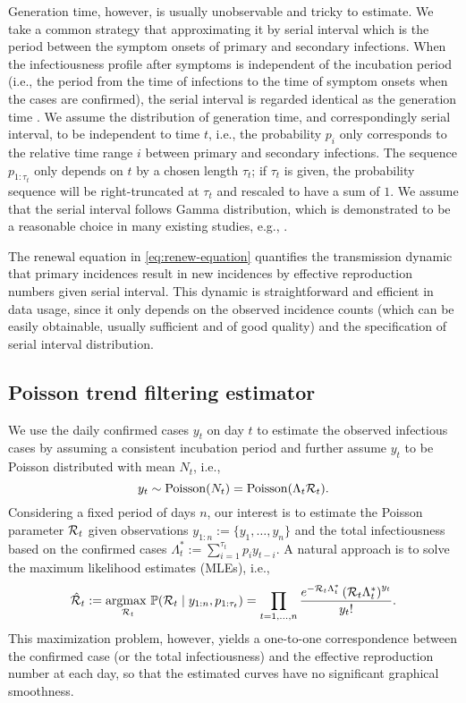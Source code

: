 Generation time, however, is usually unobservable and tricky to estimate. We take a common strategy that approximating it by serial interval which is the period between the symptom onsets of primary and secondary infections. When the infectiousness profile after symptoms is independent of the incubation period (i.e., the period from the time of infections to the time of symptom onsets when the cases are confirmed), the serial interval is regarded identical as the generation time \citep{cori2013new}. 
We assume the distribution of generation time, and correspondingly serial interval, to be independent to time $t$, i.e., the probability $p_i$ only corresponds to the relative time range $i$ between primary and secondary infections. The sequence $p_{1:\tau_t}$ only depends on $t$ by a chosen length $\tau_t$; if $\tau_t$ is given, the probability sequence will be right-truncated at $\tau_t$ and rescaled to have a sum of $1$. 
We assume that the serial interval follows Gamma distribution, which is demonstrated to be a reasonable choice in many existing studies, e.g., \cite{cori2013new,abry2020spatial,pascal2022nonsmooth}.


The renewal equation in \eqref{eq:renew-equation} quantifies the transmission dynamic that primary incidences result in new incidences by effective reproduction numbers given serial interval. This dynamic is straightforward and efficient in data usage, since it only depends on the observed incidence counts (which can be easily obtainable, usually sufficient and of good quality) and the specification of serial interval distribution. 

\subsection{Poisson trend filtering estimator} %

We use the daily confirmed cases $y_t$ on day $t$ to estimate the observed infectious cases by assuming a consistent incubation period and further assume $y_t$ to be Poisson distributed with mean $N_t$, i.e., 
\begin{equation*} 
  y_t \sim \mathrm{Poisson}(N_t) = \mathrm{Poisson}(\Lambda_t \mathcal{R}_t).
\end{equation*}
Considering a fixed period of days $n$, our interest is to estimate the Poisson parameter $\mathcal{R}_t$ given observations ${y}_{1:n} := \{y_1,\dots,y_n\}$ and the total infectiousness based on the confirmed cases $\Lambda^{\ast}_t := \sum_{i=1}^{\tau_t} p_i y_{t-i}$. A natural approach is to solve the maximum likelihood estimates (MLEs), i.e., 
\begin{equation} \label{eq:mle}
  \hat{\mathcal{R}}_t := \underset{\mathcal{R}_t}{\operatorname*{argmax}\ } \mathbb{P}(\mathcal{R}_t \mid y_{1:n}, p_{1:\tau_t}) = \prod_{t = 1,\dots,n} \frac{e^{- \mathcal{R}_t \Lambda^{\ast}_t} \left(\mathcal{R}_t \Lambda^{\ast}_t\right)^{y_t} }{y_t!}.
\end{equation}
This maximization problem, however, yields a one-to-one correspondence between the confirmed case (or the total infectiousness) and the effective reproduction number at each day, so that the estimated curves have no significant graphical smoothness. 

